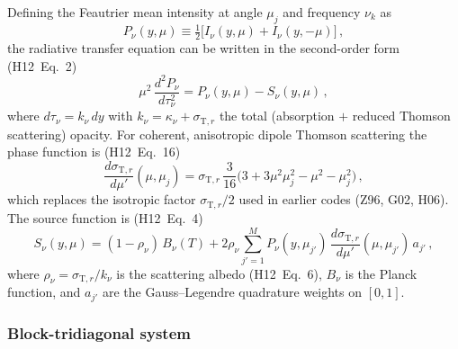 Defining the Feautrier mean intensity at angle $\mu_j$ and frequency $\nu_k$ as
\begin{equation}
  P_\nu(y,\mu) \equiv \tfrac{1}{2}\bigl[I_\nu(y,\mu) + I_\nu(y,-\mu)\bigr]\,,
  \label{eq:feautrier_P}
\end{equation}
the radiative transfer equation can be written in the second-order form (H12~Eq.~2)
\begin{equation}
  \mu^2\,\frac{d^2 P_\nu}{d\tau_\nu^2}
  = P_\nu(y,\mu) - S_\nu(y,\mu)\,,
  \label{eq:feautrier_ode}
\end{equation}
where $d\tau_\nu = k_\nu\,dy$ with $k_\nu = \kappa_\nu + \sigma_{\mathrm{T},r}$ the total (absorption $+$ reduced Thomson scattering) opacity. For coherent, anisotropic dipole Thomson scattering the phase function is (H12~Eq.~16)
\begin{equation}
  \frac{d\sigma_{\mathrm{T},r}}{d\mu'}(\mu,\mu_j)
  = \sigma_{\mathrm{T},r}\,\frac{3}{16}
    \bigl(3 + 3\mu^2\mu_j^2 - \mu^2 - \mu_j^2\bigr)\,,
  \label{eq:phase_function}
\end{equation}
which replaces the isotropic factor $\sigma_{\mathrm{T},r}/2$ used in earlier codes (Z96, G02, H06). The source function is (H12~Eq.~4)
\begin{equation}
  S_\nu(y,\mu) = (1-\rho_\nu)\,B_\nu(T)
  + 2\rho_\nu \sum_{j'=1}^{M} P_\nu(y,\mu_{j'})\,
    \frac{d\sigma_{\mathrm{T},r}}{d\mu'}(\mu,\mu_{j'})\,a_{j'}\,,
  \label{eq:source_function}
\end{equation}
where $\rho_\nu = \sigma_{\mathrm{T},r}/k_\nu$ is the scattering albedo (H12~Eq.~6), $B_\nu$ is the Planck function, and $a_{j'}$ are the Gauss--Legendre quadrature weights on $[0,1]$.

\subsubsection{Block-tridiagonal system}

